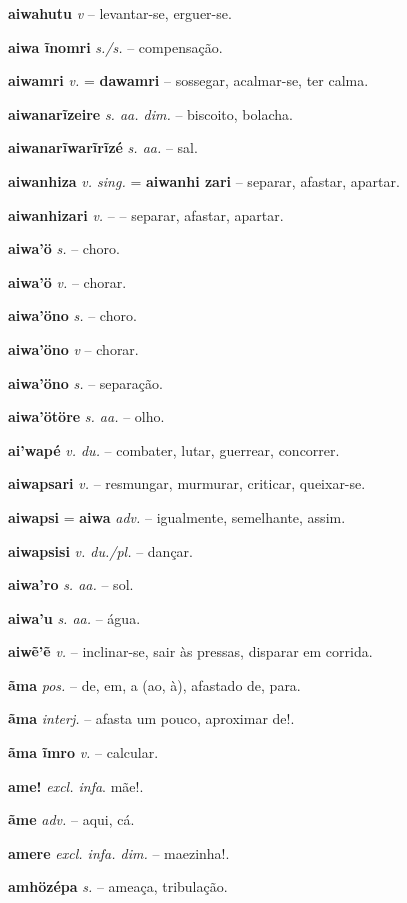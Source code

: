 \textbf{aiwahutu} \textit{v} -- levantar-se, erguer-se.

\textbf{aiwa ĩnomri} \textit{s./s.} -- compensação.

\textbf{aiwamri} \textit{v.} = \textbf{dawamri} -- sossegar, acalmar-se, ter calma.

\textbf{aiwanarĩzeire} \textit{s. aa. dim.} -- biscoito, bolacha.

\textbf{aiwanarĩwarĩrĩzé} \textit{s. aa.} -- sal.

\textbf{aiwanhiza} \textit{v. sing.} = \textbf{aiwanhi zari} -- separar, afastar, apartar.

\textbf{aiwanhizari} \textit{v.} -- -- separar, afastar, apartar.

\textbf{aiwa'ö} \textit{s.} -- choro.

\textbf{aiwa'ö} \textit{v.} -- chorar.

\textbf{aiwa'öno} \textit{s.} -- choro.

\textbf{aiwa'öno} \textit{v} -- chorar.

\textbf{aiwa'öno} \textit{s.} -- separação.

\textbf{aiwa'ötöre} \textit{s. aa.} -- olho.

\textbf{ai'wapé} \textit{v. du.} -- combater, lutar, guerrear, concorrer.

\textbf{aiwapsari} \textit{v.} -- resmungar, murmurar, criticar, queixar-se.

\textbf{aiwapsi} = \textbf{aiwa} \textit{adv.} -- igualmente, semelhante, assim.

\textbf{aiwapsisi} \textit{v. du./pl.} -- dançar.

\textbf{aiwa'ro} \textit{s. aa.} -- sol.

\textbf{aiwa'u} \textit{s. aa.} -- água.

\textbf{aiwẽ'ẽ} \textit{v.} -- inclinar-se, sair às pressas, disparar em corrida.

\textbf{ãma} \textit{pos.} -- de, em, a (ao, à), afastado de, para.

\textbf{ãma} \textit{interj.} -- afasta um pouco, aproximar de!.

\textbf{ãma ĩmro} \textit{v.} -- calcular.

\textbf{ame!} \textit{excl. infa}. mãe!.

\textbf{ãme} \textit{adv.} -- aqui, cá.

\textbf{amere} \textit{excl. infa. dim.} -- maezinha!.

\textbf{amhözépa} \textit{s.} -- ameaça, tribulação.

